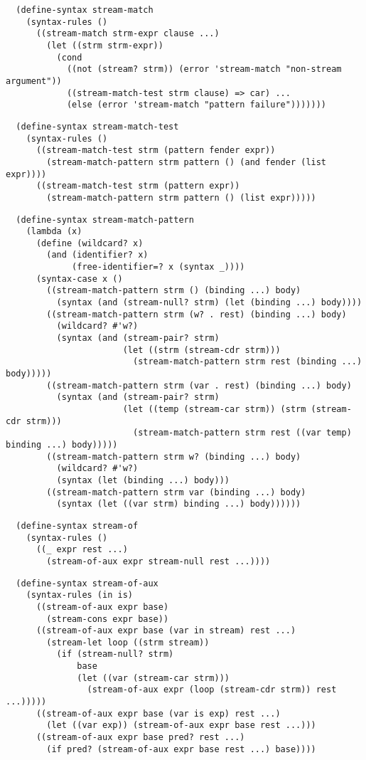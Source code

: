 \begin{verbatim}
  (define-syntax stream-match
    (syntax-rules ()
      ((stream-match strm-expr clause ...)
        (let ((strm strm-expr))
          (cond
            ((not (stream? strm)) (error 'stream-match "non-stream argument"))
            ((stream-match-test strm clause) => car) ...
            (else (error 'stream-match "pattern failure")))))))
\end{verbatim}

\begin{verbatim}
  (define-syntax stream-match-test
    (syntax-rules ()
      ((stream-match-test strm (pattern fender expr))
        (stream-match-pattern strm pattern () (and fender (list expr))))
      ((stream-match-test strm (pattern expr))
        (stream-match-pattern strm pattern () (list expr)))))
\end{verbatim}

\begin{verbatim}
  (define-syntax stream-match-pattern 
    (lambda (x)
      (define (wildcard? x)
        (and (identifier? x)
             (free-identifier=? x (syntax _))))
      (syntax-case x () 
        ((stream-match-pattern strm () (binding ...) body)
          (syntax (and (stream-null? strm) (let (binding ...) body))))
        ((stream-match-pattern strm (w? . rest) (binding ...) body)
          (wildcard? #'w?) 
          (syntax (and (stream-pair? strm)
                       (let ((strm (stream-cdr strm)))
                         (stream-match-pattern strm rest (binding ...) body)))))
        ((stream-match-pattern strm (var . rest) (binding ...) body)
          (syntax (and (stream-pair? strm)
                       (let ((temp (stream-car strm)) (strm (stream-cdr strm))) 
                         (stream-match-pattern strm rest ((var temp) binding ...) body)))))
        ((stream-match-pattern strm w? (binding ...) body)
          (wildcard? #'w?)
          (syntax (let (binding ...) body)))
        ((stream-match-pattern strm var (binding ...) body) 
          (syntax (let ((var strm) binding ...) body))))))
\end{verbatim}

\begin{verbatim}
  (define-syntax stream-of
    (syntax-rules ()
      ((_ expr rest ...)
        (stream-of-aux expr stream-null rest ...))))
\end{verbatim}

\begin{verbatim}
  (define-syntax stream-of-aux
    (syntax-rules (in is)
      ((stream-of-aux expr base)
        (stream-cons expr base))
      ((stream-of-aux expr base (var in stream) rest ...)
        (stream-let loop ((strm stream))
          (if (stream-null? strm)
              base
              (let ((var (stream-car strm)))
                (stream-of-aux expr (loop (stream-cdr strm)) rest ...)))))
      ((stream-of-aux expr base (var is exp) rest ...)
        (let ((var exp)) (stream-of-aux expr base rest ...)))
      ((stream-of-aux expr base pred? rest ...)
        (if pred? (stream-of-aux expr base rest ...) base))))
\end{verbatim}

